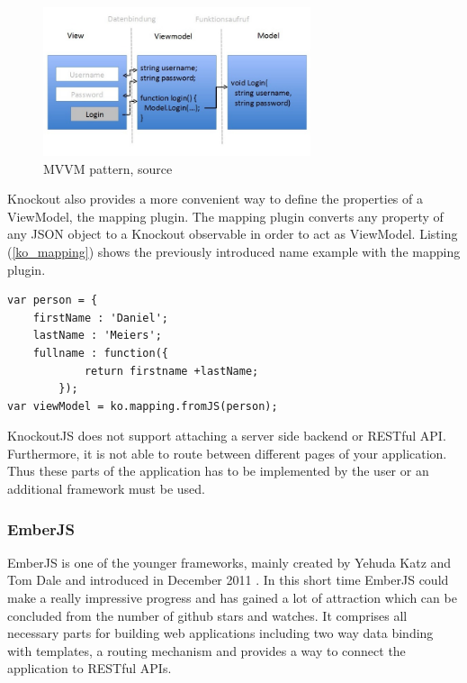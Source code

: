 \begin{figure}[h]
	\centering	
	\includegraphics[width=0.7\textwidth]{./img/tech-ana/mvvm.jpeg}
	\caption{MVVM pattern, source \autocite{heise_knockout}}
	\label{fig:mvvm}
\end{figure}

Knockout also provides a more convenient way to define the properties of a ViewModel, the mapping plugin.
The mapping plugin converts any property of any JSON object to a Knockout observable in order to act as ViewModel.
Listing (\ref{ko_mapping}) shows the previously introduced name example with the mapping plugin.

\begin{lstlisting}[label=ko_mapping,caption=the mapping plugin]
var person = {
	firstName : 'Daniel';
	lastName : 'Meiers';
	fullname : function({
			return firstname +lastName;
		});
var viewModel = ko.mapping.fromJS(person);
\end{lstlisting}

KnockoutJS does not support attaching a server side backend or RESTful API.
Furthermore, it is not able to route between different pages of your application.
Thus these parts of the application has to be implemented by the user or an additional framework must be used.

\subsubsection{EmberJS}

EmberJS is one of the younger frameworks, mainly created by Yehuda Katz and Tom Dale and introduced in December 2011 \autocite{tech-ana:announcing-ember}.
In this short time EmberJS could make a really impressive progress and has gained a lot of attraction which can be concluded from the number of github stars and watches.
It comprises all necessary parts for building web applications including two way data binding with templates, a routing mechanism and provides a way to connect the application to RESTful APIs.


